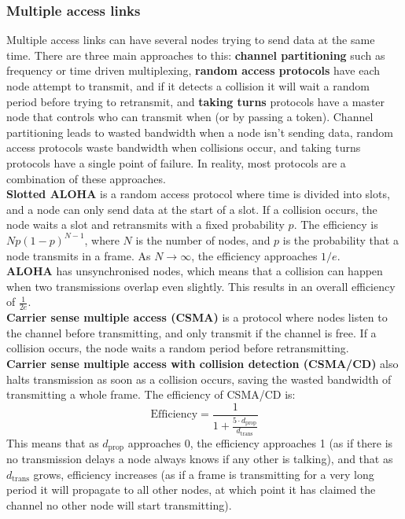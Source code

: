 \subsubsection{Multiple access links}
Multiple access links can have several nodes trying to send data at the same time. There are three main approaches to this: \textbf{channel partitioning} such as frequency or time driven multiplexing, \textbf{random access protocols} have each node attempt to transmit, and if it detects a collision it will wait a random period before trying to retransmit, and \textbf{taking turns} protocols have a master node that controls who can transmit when (or by passing a token). Channel partitioning leads to wasted bandwidth when a node isn't sending data, random access protocols waste bandwidth when collisions occur, and taking turns protocols have a single point of failure. In reality, most protocols are a combination of these approaches.\\
\textbf{Slotted ALOHA} is a random access protocol where time is divided into slots, and a node can only send data at the start of a slot. If a collision occurs, the node waits a slot and retransmits with a fixed probability $p$. The efficiency is $Np(1-p)^{N-1}$, where $N$ is the number of nodes, and $p$ is the probability that a node transmits in a frame. As $N\rightarrow\infty$, the efficiency approaches $1/e$.\\
\textbf{ALOHA} has unsynchronised nodes, which means that a collision can happen when two transmissions overlap even slightly. This results in an overall efficiency of $\frac{1}{2e}$.\\
\textbf{Carrier sense multiple access (CSMA)} is a protocol where nodes listen to the channel before transmitting, and only transmit if the channel is free. If a collision occurs, the node waits a random period before retransmitting.\\
\textbf{Carrier sense multiple access with collision detection (CSMA/CD)} also halts transmission as soon as a collision occurs, saving the wasted bandwidth of transmitting a whole frame. The efficiency of CSMA/CD is:
$$
	\text{Efficiency}=\frac{1}{1+\frac{5\cdot d_\text{prop}}{d_\text{trans}}}
$$
This means that as $d_\text{prop}$ approaches 0, the efficiency approaches 1 (as if there is no transmission delays a node always knows if any other is talking), and that as $d_\text{trans}$ grows, efficiency increases (as if a frame is transmitting for a very long period it will propagate to all other nodes, at which point it has claimed the channel no other node will start transmitting).\\
